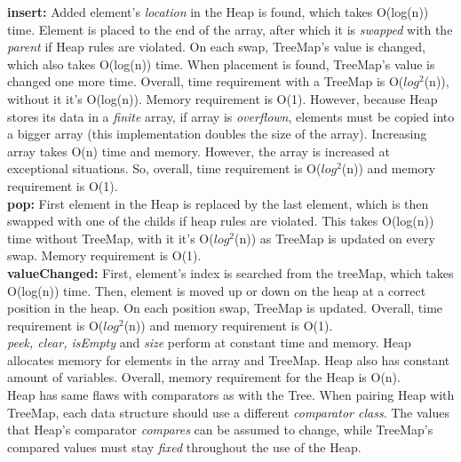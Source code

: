 \documentclass[a4paper,12pt]{article}
\begin{document}
\textbf{insert:} Added element's \emph{location} in the Heap is found, which takes O(log(n)) time. Element is placed to the end of the array, after which it is \emph{swapped} with the \emph{parent} if Heap rules are violated. On each swap, TreeMap's value is changed, which also takes O(log(n)) time. When placement is found, TreeMap's value is changed one more time. Overall, time requirement with a TreeMap is O($log^{2}$(n)), without it it's O(log(n)). Memory requirement is O(1). However, because Heap stores its data in a \emph{finite} array, if array is \emph{overflown}, elements must be copied into a bigger array (this implementation doubles the size of the array). Increasing array takes O(n) time and memory. However, the array is increased at exceptional situations. So, overall, time requirement is O($log^{2}$(n)) and memory requirement is O(1).
\\

\textbf{pop:} First element in the Heap is replaced by the last element, which is then swapped with one of the childs if heap rules are violated. This takes O(log(n)) time without TreeMap, with it it's O($log^{2}$(n)) as TreeMap is updated on every swap. Memory requirement is O(1).
\\

\textbf{valueChanged:} First, element's index is searched from the treeMap, which takes O(log(n)) time. Then, element is moved up or down on the heap at a correct position in the heap. On each position swap, TreeMap is updated. Overall, time requirement is O($log^{2}$(n)) and memory requirement is O(1).
\\

\emph{peek, clear, isEmpty} and \emph{size} perform at constant time and memory. Heap allocates memory for elements in the array and TreeMap. Heap also has constant amount of variables. Overall, memory requirement for the Heap is O(n).\\
Heap has same flaws with comparators as with the Tree. When pairing Heap with TreeMap, each data structure should use a different \emph{comparator class}. The values that Heap's comparator \emph{compares} can be assumed to change, while TreeMap's compared values must stay \emph{fixed} throughout the use of the Heap. 
\end{document}
